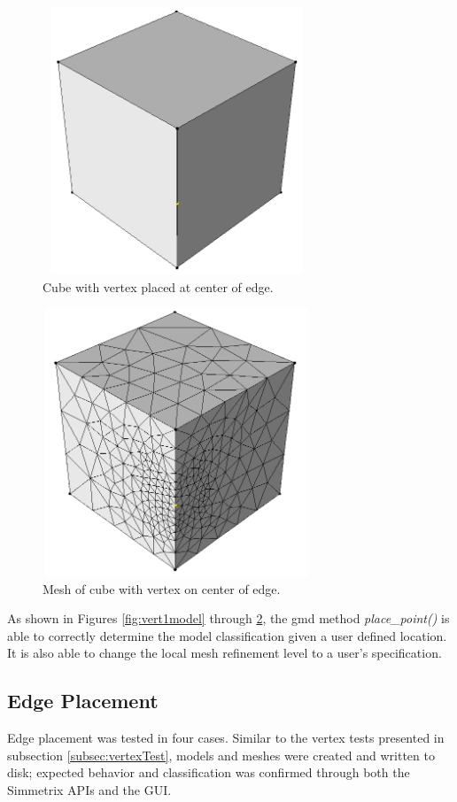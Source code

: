 \documentclass[a4paper, 12pt]{article}
\begin{document}
\begin{figure}[H]
  \centering
  \includegraphics[width=8cm, height=8cm]{test5_smd}
  \caption{Cube with vertex placed at center of edge.}
  \label{fig:vert3model}
\end{figure}

\begin{figure}[H]
  \centering
  \includegraphics[width=8cm, height=8cm]{test5_sms}
  \caption{Mesh of cube with vertex on center of edge.}
  \label{fig:vert3mesh}
\end{figure}

As shown in Figures \ref{fig:vert1model} through \ref{fig:vert3mesh}, 
the gmd method \emph{place\_point()} is able to correctly determine 
the model classification given a user defined location. It is also 
able to change the local mesh refinement level to a user's specification. 

\subsection{Edge Placement} \label{subsec:edgeTest}
Edge placement was tested in four cases. Similar to the vertex tests 
presented in subsection \ref{subsec:vertexTest}, models and meshes
were created and written to disk; expected behavior and classification
was confirmed through both the Simmetrix APIs and the GUI.
\end{document}
